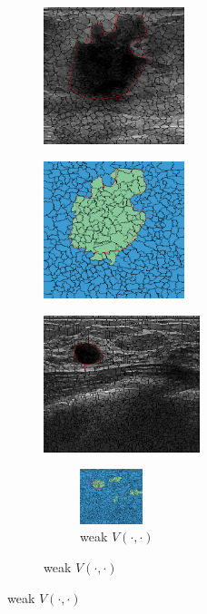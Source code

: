 \begin{figure}[h]
  \centering

  \begin{subfigure}[b]{0.20\textwidth}
    \centering
    \includegraphics[trim= 20 0 30 0, clip, height=4cm]{goodQSorigin}
    \caption{}
  \end{subfigure}
  \hfill
  \begin{subfigure}[b]{0.20\textwidth}
    \centering
    \includegraphics[trim= 20 0 30 0, clip, height=4cm]{goodQSseg}
    \caption{}
    \label{fig:results:perfect}
  \end{subfigure}
  \hfill
  \begin{subfigure}[b]{0.35\textwidth}
    \centering
    \includegraphics[trim = 0 90 0 0, clip, height=4cm]{fporigin}
    \caption{}
  \end{subfigure}
  \hfill
  \begin{subfigure}[b]{0.15\textwidth}
    \begin{subfigure}[b]{\textwidth}
      \includegraphics[trim = 0 90 0 0, clip, height=1.6cm]{fpnohom}
      \caption{\small weak $V(\cdot,\cdot)$}

\end{subfigure}
\end{subfigure}
\end{figure}
